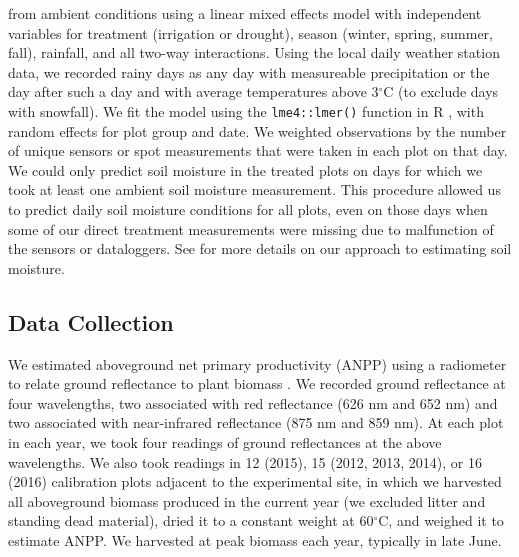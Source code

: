 \documentclass[fleqn,10pt,lineno]{wlpeerj} %
\begin{document}
from ambient conditions using a linear mixed effects model with
independent variables for treatment (irrigation or drought), season
(winter, spring, summer, fall), rainfall, and all two-way interactions.
Using the local daily weather station data, we recorded rainy days as
any day with measureable precipitation or the day after such a day and
with average temperatures above 3\(^{\circ}\)C (to exclude days with
snowfall). We fit the model using the \texttt{lme4::lmer()} function
\citep{Bates2015} in R \citep{R2016}, with random effects for plot group
and date. We weighted observations by the number of unique sensors or
spot measurements that were taken in each plot on that day.
We could only predict soil moisture in the treated plots on days for
which we took at least one ambient soil moisture measurement. This
procedure allowed us to predict daily soil moisture conditions for all
plots, even on those days when some of our direct treatment measurements
were missing due to malfunction of the sensors or dataloggers. See
\citet{Kleinhesselink2017b} for more details on our approach to
estimating soil moisture.

\subsection{Data Collection}\label{data-collection}

We estimated aboveground net primary productivity (ANPP) using a
radiometer to relate ground reflectance to plant biomass \citep[see][
for a review]{Byrne2011}. We recorded ground reflectance at four
wavelengths, two associated with red reflectance (626 nm and 652 nm) and
two associated with near-infrared reflectance (875 nm and 859 nm). At
each plot in each year, we took four readings of ground reflectances at
the above wavelengths. We also took readings in 12 (2015), 15 (2012,
2013, 2014), or 16 (2016) calibration plots adjacent to the experimental
site, in which we harvested all aboveground biomass produced in the
current year (we excluded litter and standing dead material), dried it
to a constant weight at 60\(^{\circ}\)C, and weighed it to estimate
ANPP. We harvested at peak biomass each year, typically in late June.
\end{document}
